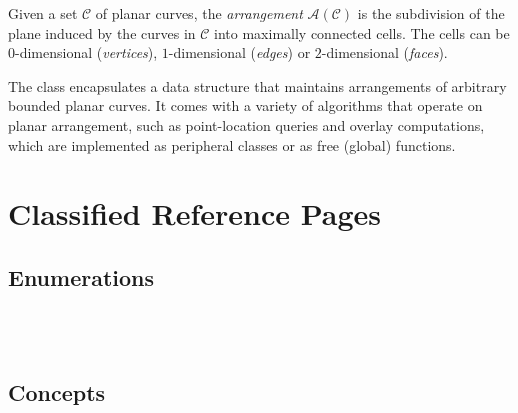 
Given a set $\mathcal{C}$ of planar curves, the {\em arrangement}
${\mathcal A}({\mathcal C})$ is the subdivision of the plane induced
by the curves in $\mathcal{C}$ into maximally connected cells. The cells
can be $0$-dimensional ({\em vertices}), $1$-dimensional ({\em edges})
or $2$-dimensional ({\em faces}).

The class  encapsulates a data structure
that maintains arrangements of arbitrary bounded planar curves. It comes
with a variety of algorithms that operate on planar arrangement,
such as point-location queries and overlay computations, which are
implemented as peripheral classes or as free (global) functions.

\section{Classified Reference Pages}

\subsection*{Enumerations}

\\
\\

\subsection*{Concepts}

